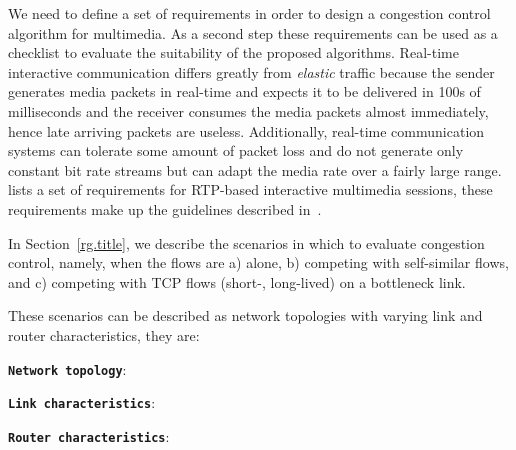 We need to define a set of requirements in order to design a congestion
control algorithm for multimedia. As a second step these requirements can be
used as a checklist to evaluate the suitability of the proposed algorithms.
Real-time interactive communication differs greatly from \emph{elastic}
traffic because the sender generates media packets in real-time and expects it
to be delivered in 100s of milliseconds and the receiver consumes the media
packets almost immediately, hence late arriving packets are useless.
Additionally, real-time communication systems can tolerate some amount of
packet loss and do not generate only constant bit rate streams but can adapt
the media rate over a fairly large range. \cite{draft.rmcat.req} lists a set
of requirements for RTP-based interactive multimedia sessions, these
requirements make up the guidelines described in~\cite{draft.rmcat.evaluate}.

In Section~\ref{rg.title}, we describe the scenarios in which to evaluate
congestion control, namely, when the flows are a) alone, b) competing with
self-similar flows, and c) competing with TCP flows (short-, long-lived) on a
bottleneck link.

These scenarios can be described as network topologies with varying link and
router characteristics, they are:

\textbf{\texttt{Network topology}}:

\textbf{\texttt{Link characteristics}}:

\textbf{\texttt{Router characteristics}}:


